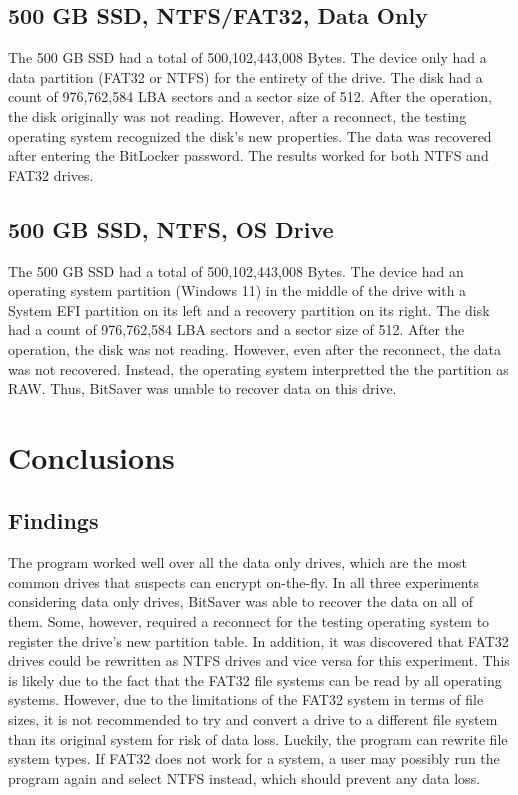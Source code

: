 \documentclass[conference]{IEEEtran} \IEEEoverridecommandlockouts
\begin{document}
\subsection{500 GB SSD, NTFS/FAT32, Data Only}

The 500 GB SSD had a total of 500,102,443,008 Bytes. The device only had a data partition (FAT32 or NTFS) for the entirety of the drive. The disk had
a count of 976,762,584 LBA sectors and a sector size of 512. After the operation, the disk originally was
not reading. However, after a reconnect, the testing operating system recognized the disk's new properties. The data was recovered after entering the BitLocker password.
The results worked for both NTFS and FAT32 drives. 

\subsection{500 GB SSD, NTFS, OS Drive}

The 500 GB SSD had a total of 500,102,443,008 Bytes. The device had an operating system partition (Windows 11) in the middle of the drive with a System EFI partition on its
left and a recovery partition on its right. The disk had a count of 976,762,584 LBA sectors and a sector size of 512. After the operation, the disk was not reading. However,
even after the reconnect, the data was not recovered. Instead, the operating system interpretted the 
the partition as RAW. Thus, BitSaver was unable to recover data on this drive.


\section{Conclusions}\label{conclusions} 


\subsection{Findings} 

The program worked well over all the data only drives, which are the most
common drives that suspects can encrypt on-the-fly. In all three experiments
considering data only drives, BitSaver was able to recover the data on all of
them. Some, however, required a reconnect for the testing operating system to
register the drive's new partition table. In addition, it was discovered that FAT32 drives
could be rewritten as NTFS drives and vice versa for this experiment. This is
likely due to the fact that the FAT32 file systems can be read by all operating
systems. However, due to the limitations of the FAT32 system in terms of file
sizes, it is not recommended to try and convert a drive to a different file
system than its original system for risk of data loss. Luckily, the program can rewrite file system
types. If FAT32 does not work for a system, a user may possibly run the program
again and select NTFS instead, which should prevent any data loss.
\end{document}
